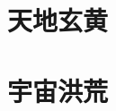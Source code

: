 \documentclass[UTF8]{ctexart}
\begin{document}
	\section{天地玄黄}
	\newpage
	\section{宇宙洪荒}
\end{document}
